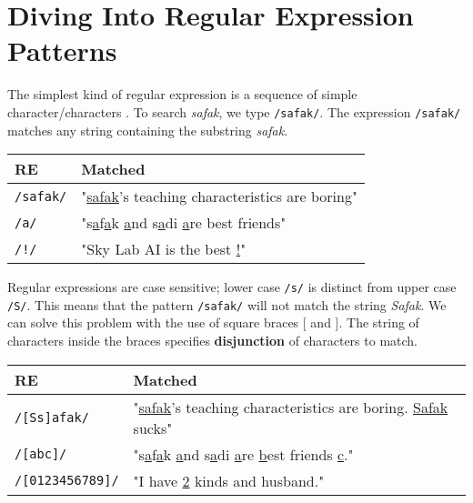 \documentclass[11pt]{article}
\begin{document}
\section*{Diving Into Regular Expression Patterns}
\hspace*{1cm} The simplest kind of regular expression is a sequence of simple character/characters	. To search \textit{safak}, we type \texttt{/safak/}. The expression \texttt{/safak/} matches any string containing the substring \textit{safak}.
\renewcommand{\arraystretch}{1.5}
\begin{center}
\begin{tabular}{ |p{4cm}|p{10cm}| }
 \hline
 \hline
 \textbf{RE}& \hspace*{0.6cm}\textbf{Matched} \\
 \hline
 \hline
 \texttt{/safak/}   & "\underline{safak}'s teaching characteristics are boring"  \\
 \hline
 \texttt{/a/}     & "s\underline{a}f\underline{a}k \underline{a}nd s\underline{a}di \underline{a}re best friends"          \\
 \hline
 \texttt{/!/}      & "Sky Lab AI is the best \underline{!}"        \\
 \hline
 \hline
\end{tabular}
\end{center}
\renewcommand{\arraystretch}{1}
Regular expressions are case sensitive; lower case \texttt{/s/} is distinct from upper case \texttt{/S/}. This means that the pattern \texttt{/safak/} will not match the string \textit{Safak}. We can solve this problem with the use of square braces [ and ]. The string of characters inside the braces specifies \textbf{disjunction} of characters to match.
\renewcommand{\arraystretch}{1.5}
\begin{center}
\begin{tabular}{ |p{4cm}|p{10cm}| }
 \hline
 \hline
 \textbf{RE}& \hspace*{0.6cm}\textbf{Matched} \\
 \hline
 \hline
 \texttt{/[Ss]afak/}   & "\underline{safak}'s teaching characteristics are boring. \underline{Safak} sucks"  \\
 \hline
 \texttt{/[abc]/}     & "s\underline{a}f\underline{a}k \underline{a}nd s\underline{a}di \underline{a}re \underline{b}est friends \underline{c}."          \\
 \hline
 \texttt{/[0123456789]/}      & "I have \underline{2} kinds and \underline{} husband."        \\
 \hline
 \hline
\end{tabular}
\end{center}
\end{document}
